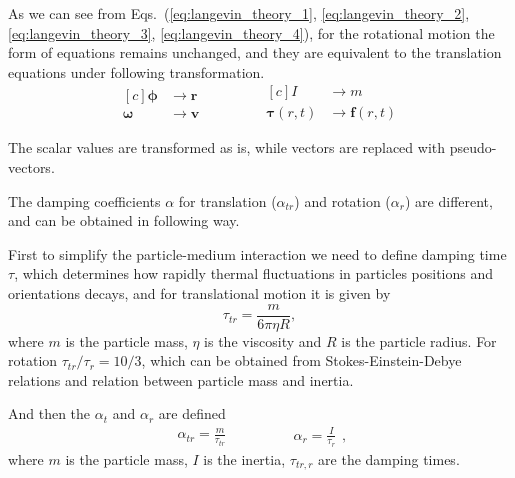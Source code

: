 As we can see from Eqs.~(\ref{eq:langevin_theory_1}, \ref{eq:langevin_theory_2}, \ref{eq:langevin_theory_3}, \ref{eq:langevin_theory_4}), for the rotational motion the form of equations remains unchanged, and they are equivalent to the translation equations under following transformation.
\begin{equation}
\label{eq:rotation_translation_substitution}
	\begin{aligned}[c]
		\boldsymbol{\phi} &\rightarrow \boldsymbol{r}        \\
		\boldsymbol{\omega} &\rightarrow \boldsymbol{v} 
	\end{aligned}
	\qquad
	\qquad
	\begin{aligned}[c]
		I &\rightarrow m        \\
		\boldsymbol{\tau}(r, t) &\rightarrow \boldsymbol{f}(r, t)
	\end{aligned}
\end{equation}

The scalar values are transformed as is, while vectors are replaced with pseudo-vectors.

The damping coefficients $\alpha$ for translation ($\alpha_{tr}$) and rotation ($\alpha_r$) are different, and can be obtained in following way.

First to simplify the particle-medium interaction we need to define damping time $\tau$, which determines how rapidly thermal fluctuations in particles positions and orientations decays, and for translational motion it is given by
\begin{equation}
\label{eq:Translation_damping_time}
	\tau_{tr} = \frac{m}{6 \pi \eta R}
	,
\end{equation}
where $m$ is the particle mass, $\eta$ is the viscosity and $R$ is the particle radius. For rotation $\tau_{tr} / \tau_{r} = 10/3$, which can be obtained from Stokes-Einstein-Debye relations and relation between particle mass and inertia.

And then the $\alpha_t$ and $\alpha_r$ are defined
\begin{equation}
	\begin{aligned}
		\alpha_{tr} = \frac{m}{\tau_{tr}}
	\end{aligned}
	\qquad
	\qquad
	\begin{aligned}
		\alpha_r = \frac{I}{\tau_r}
	\end{aligned}
	,
\end{equation}
where $m$ is the particle mass, $I$ is the inertia, $\tau_{tr,r}$ are the damping times.

